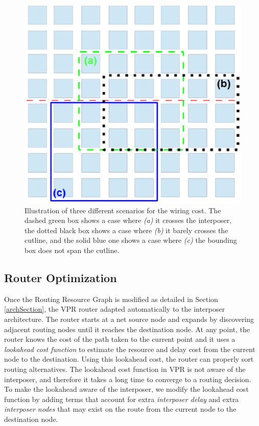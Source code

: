 \documentclass[journal]{IEEEtran}
\begin{document}
\begin{figure}[!h]
\centering
\includegraphics[width=0.75\linewidth]{bb_new.eps}
\caption{Illustration of three different scenarios for the wiring cost. The dashed green box shows a case where \textit{(a)} it crosses the interposer, the dotted black box shows a case where \textit{(b)} it barely crosses the cutline, and the solid blue one shows a case where \textit{(c)} the bounding box does not span the cutline.}
\label{fig:bb_illustration}
\end{figure}


\subsection{Router Optimization}
\label{sec:router_optimizations}
Once the Routing Resource Graph is modified as detailed in Section \ref{archSection}, the VPR router adapted automatically to the interposer architecture. The router starts at a net source node and expands by discovering adjacent routing nodes until it reaches the destination node. At any point, the router knows the cost of the path taken to the current point and it uses a \textit{lookahead cost function} to estimate the resource and delay cost from the current node to the destination. Using this lookahead cost, the router can properly sort routing alternatives. The lookahead cost function in VPR is not aware of the interposer, and therefore it takes a long time to converge to a routing decision. To make the lookahead aware of the interposer, we modify the lookahead cost function by adding terms that account for extra \textit{interposer delay} and extra \textit{interposer nodes} that may exist on the route from the current node to the destination node.
\end{document}
